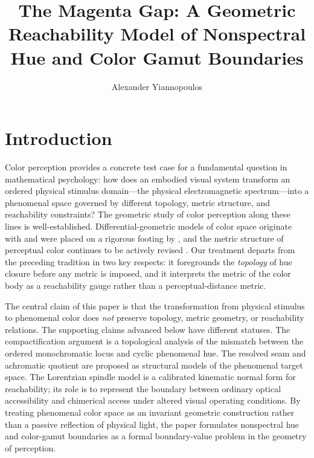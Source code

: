 \documentclass[preprint,12pt,authoryear]{elsarticle}
\theoremstyle{plain}
\theoremstyle{definition}
\theoremstyle{remark}
\begin{document}
\begin{frontmatter}

\title{The Magenta Gap: A Geometric Reachability Model of Nonspectral Hue and Color Gamut Boundaries}

\author[ao]{Alexander Yiannopoulos}
\address[ao]{A$\lvert\Omega\rangle$ Institute, Alpha Omega Lattice Corporation\\3724 Laurel Street, Suite 108, New Orleans, Louisiana, USA}

\end{frontmatter}

\section{Introduction}
\label{sec:introduction}

\noindent Color perception provides a concrete test case for a fundamental question in mathematical psychology: how does an embodied visual system transform an ordered physical stimulus domain---the physical electromagnetic spectrum---into a phenomenal space governed by different topology, metric structure, and reachability constraints? The geometric study of color perception along these lines is well-established. Differential-geometric models of color space originate with \citet{Schrodinger1920} and were placed on a rigorous footing by \citet{Resnikoff1974}, and the metric structure of perceptual color continues to be actively revised \citep{Bujack2022}. Our treatment departs from the preceding tradition in two key respects: it foregrounds the \emph{topology} of hue closure before any metric is imposed, and it interprets the metric of the color body as a reachability gauge rather than a perceptual-distance metric.

The central claim of this paper is that the transformation from physical stimulus to phenomenal color does \emph{not} preserve topology, metric geometry, or reachability relations. The supporting claims advanced below have different statuses. The compactification argument is a topological analysis of the mismatch between the ordered monochromatic locus and cyclic phenomenal hue. The resolved seam and achromatic quotient are proposed as structural models of the phenomenal target space. The Lorentzian spindle model is a calibrated kinematic normal form for reachability; its role is to represent the boundary between ordinary optical accessibility and chimerical access under altered visual operating conditions. By treating phenomenal color space as an invariant geometric construction rather than a passive reflection of physical light, the paper formulates nonspectral hue and color-gamut boundaries as a formal boundary-value problem in the geometry of perception.
\end{document}
